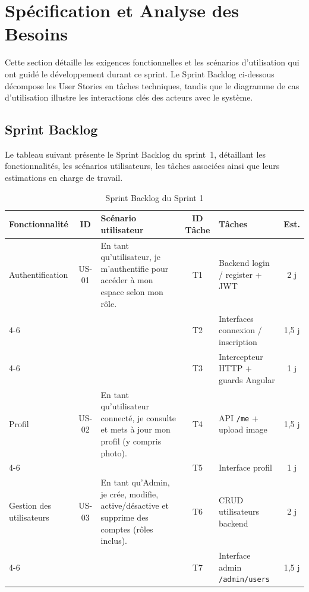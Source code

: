 \section{Spécification et Analyse des Besoins}

Cette section détaille les exigences fonctionnelles et les scénarios
d'utilisation qui ont guidé le développement durant ce sprint. Le Sprint
Backlog ci-dessous décompose les User Stories en tâches techniques, tandis
que le diagramme de cas d'utilisation illustre les interactions clés des
acteurs avec le système.


\subsection{Sprint Backlog}

Le tableau suivant présente le Sprint Backlog du sprint~1, détaillant les
fonctionnalités, les scénarios utilisateurs, les tâches associées ainsi que
leurs estimations en charge de travail.

\begin{table}[htbp]
  \centering
  \scriptsize
  \caption{Sprint Backlog du Sprint 1}
  \label{tab:sprint1-backlog}
  \begin{tabular}{|p{2.1cm}|c|p{4.0cm}|c|p{3.4cm}|c|}
    \hline
    \textbf{Fonctionnalité} & \textbf{ID} & \textbf{Scénario utilisateur} &
    \textbf{ID Tâche} & \textbf{Tâches} & \textbf{Est.} \\
    \hline
    Authentification
    & US-01
    & En tant qu'utilisateur, je m'authentifie pour accéder à mon espace selon mon rôle.
    & T1
    & Backend login / register + JWT
    & 2 j \\
    \cline{4-6}
    & & & T2 & Interfaces connexion / inscription & 1,5 j \\
    \cline{4-6}
    & & & T3 & Intercepteur HTTP + guards Angular & 1 j \\
    \hline
    Profil
    & US-02
    & En tant qu'utilisateur connecté, je consulte et mets à jour mon profil (y compris photo).
    & T4
    & API \texttt{/me} + upload image
    & 1,5 j \\
    \cline{4-6}
    & & & T5 & Interface profil & 1 j \\
    \hline
    Gestion des utilisateurs
    & US-03
    & En tant qu'Admin, je crée, modifie, active/désactive et supprime des comptes (rôles inclus).
    & T6
    & CRUD utilisateurs backend
    & 2 j \\
    \cline{4-6}
    & & & T7 & Interface admin \texttt{/admin/users} & 1,5 j \\
    \hline
  \end{tabular}
\end{table}


